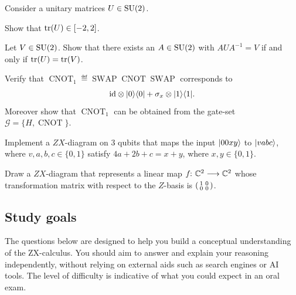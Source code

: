 \documentclass[a4paper, oneside, 12pt]{amsart}
\DeclareMathOperator{\SWAP}{SWAP}
\DeclareMathOperator{\CNOT}{CNOT}
\begin{document}
\begin{exercise}[Hard]\label{exe:conjugacy-classes-su2}
  Consider a unitary matrices \(U\in\operatorname{SU}(2)\).
  \begin{thmlist}
    \item Show that \(\operatorname{tr}(U)\in [-2, 2]\).
    \item  Let \(V\in\operatorname{SU}(2)\). Show that  there exists an \(A\in \operatorname{SU}(2)\) with \(AUA^{-1}= V\) if and only if \(\operatorname{tr}(U) = \operatorname{tr}(V)\).
  \end{thmlist}
\end{exercise}

\begin{exercise}\label{exe:flipped-cnot-using-cnot-Hadamard}
  Verify that \(\CNOT_{1}\eqdef\SWAP \CNOT \SWAP\) corresponds to
  \begin{equation*}
     \mathrm{id} \otimes \lvert0\rangle\langle0\rvert + \sigma_{x} \otimes \lvert1\rangle\langle1\rvert.
  \end{equation*}
  Moreover show that \(\CNOT_{1}\) can be obtained from the gate-set \(\mathcal{G}= \{H, \CNOT\}\).
\end{exercise}

\begin{exercise}
  Implement a \(ZX\)-diagram on \(3\) qubits that maps the input \(\lvert00xy\rangle\) to \(\lvert vabc\rangle\),
  where \(v,a,b,c \in\{0,1\}\) satisfy \(4a+ 2b + c = x+y\), where \(x,y\in\{0,1\}\).
\end{exercise}

\begin{exercise}
  Draw a \(ZX\)-diagram that represents a linear map \(f\from \mathbb{C}^{2} \to \mathbb{C}^{2}\) whose transformation matrix with respect to the \(Z\)-basis is \(
  \begin{psmallmatrix}
    1 & 0 \\ 0 & 0
  \end{psmallmatrix}
  \).
\end{exercise}

\cleardoublepage
\subsection{Study goals}\label{sec:ZX-study-goals}
The questions below are designed to help you build a conceptual understanding of the ZX-calculus.
You should aim to answer and explain your reasoning independently, without relying on external aids such as search engines or AI tools.
The level of difficulty is indicative of what you could expect in an oral exam.
\end{document}
